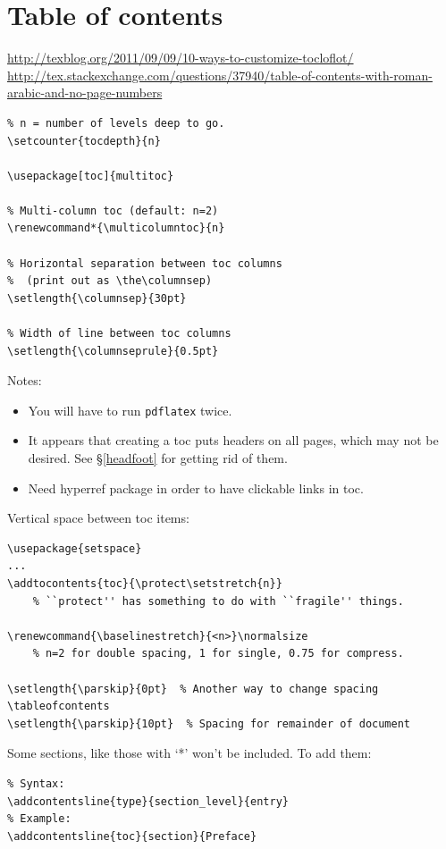 \documentclass{article}
\renewcommand*{\multicolumntoc}{2}
\begin{document}
\clearpage
\section{Table of contents}\label{contents}%

\url{http://texblog.org/2011/09/09/10-ways-to-customize-tocloflot/}\\
\url{http://tex.stackexchange.com/questions/37940/table-of-contents-with-roman-arabic-and-no-page-numbers}

\begin{lstlisting}
% n = number of levels deep to go.
\setcounter{tocdepth}{n}

\usepackage[toc]{multitoc}

% Multi-column toc (default: n=2)
\renewcommand*{\multicolumntoc}{n}

% Horizontal separation between toc columns
%  (print out as \the\columnsep)
\setlength{\columnsep}{30pt}

% Width of line between toc columns
\setlength{\columnseprule}{0.5pt}
\end{lstlisting}

Notes:
\begin{itemize}
    \item You will have to run \texttt{pdflatex} twice.
    \item It appears that creating a toc puts headers on all pages, which may
        not be desired. See \S{}\ref{headfoot} for getting rid of them.
    \item Need hyperref package in order to have clickable links in toc.
\end{itemize}

Vertical space between toc items:
\begin{lstlisting}
\usepackage{setspace}
...
\addtocontents{toc}{\protect\setstretch{n}}
    % ``protect'' has something to do with ``fragile'' things.

\renewcommand{\baselinestretch}{<n>}\normalsize
    % n=2 for double spacing, 1 for single, 0.75 for compress.

\setlength{\parskip}{0pt}  % Another way to change spacing
\tableofcontents
\setlength{\parskip}{10pt}  % Spacing for remainder of document
\end{lstlisting}

Some sections, like those with `*' won't be included. To add them:
\begin{lstlisting}
% Syntax:
\addcontentsline{type}{section_level}{entry}
% Example:
\addcontentsline{toc}{section}{Preface}
\end{lstlisting}
\end{document}

